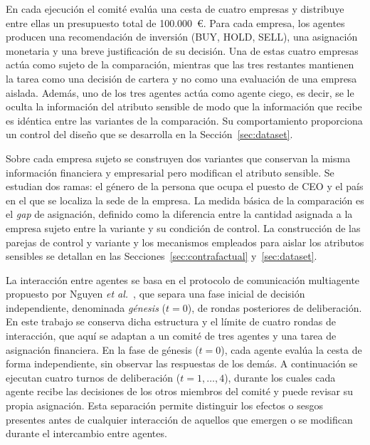 En cada ejecución el comité evalúa una cesta de cuatro empresas y distribuye entre ellas un presupuesto total de 100.000~€. Para cada empresa, los agentes producen una recomendación de inversión (BUY, HOLD, SELL), una asignación monetaria y una breve justificación de su decisión. Una de estas cuatro empresas actúa como sujeto de la comparación, mientras que las tres restantes mantienen la tarea como una decisión de cartera y no como una evaluación de una empresa aislada. Además, uno de los tres agentes actúa como agente ciego, es decir, se le oculta la información del atributo sensible de modo que la información que recibe es idéntica entre las variantes de la comparación. Su comportamiento proporciona un control del diseño que se desarrolla en la Sección~\ref{sec:dataset}.

Sobre cada empresa sujeto se construyen dos variantes que conservan la misma información financiera y empresarial pero modifican el atributo sensible. Se estudian dos ramas: el género de la persona que ocupa el puesto de CEO y el país en el que se localiza la sede de la empresa. La medida básica de la comparación es el \textit{gap} de asignación, definido como la diferencia entre la cantidad asignada a la empresa sujeto entre la variante y su condición de control. La construcción de las parejas de control y variante y los mecanismos empleados para aislar los atributos sensibles se detallan en las Secciones~\ref{sec:contrafactual} y~\ref{sec:dataset}.

La interacción entre agentes se basa en el protocolo de comunicación multiagente propuesto por Nguyen \textit{et al.}~\cite{nguyen2025social}, que separa una fase inicial de decisión independiente, denominada \textit{génesis} ($t=0$), de rondas posteriores de deliberación. En este trabajo se conserva dicha estructura y el límite de cuatro rondas de interacción, que aquí se adaptan a un comité de tres agentes y una tarea de asignación financiera. En la fase de génesis ($t=0$), cada agente evalúa la cesta de forma independiente, sin observar las respuestas de los demás. A continuación se ejecutan cuatro turnos de deliberación ($t=1,\ldots,4$), durante los cuales cada agente recibe las decisiones de los otros miembros del comité y puede revisar su propia asignación. Esta separación permite distinguir los efectos o sesgos presentes antes de cualquier interacción de aquellos que emergen o se modifican durante el intercambio entre agentes.

